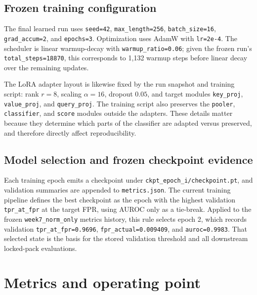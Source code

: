 \subsection{Frozen training configuration}

The final learned run uses \texttt{seed=42}, \texttt{max\_length=256}, \texttt{batch\_size=16}, \texttt{grad\_accum=2}, and \texttt{epochs=3}. Optimization uses AdamW with \texttt{lr=2e-4}. The scheduler is linear warmup-decay with \texttt{warmup\_ratio=0.06}; given the frozen run's \texttt{total\_steps=18870}, this corresponds to 1,132 warmup steps before linear decay over the remaining updates.

The LoRA adapter layout is likewise fixed by the run snapshot and training script: rank $r=8$, scaling $\alpha=16$, dropout $0.05$, and target modules \texttt{key\_proj}, \texttt{value\_proj}, and \texttt{query\_proj}. The training script also preserves the \texttt{pooler}, \texttt{classifier}, and \texttt{score} modules outside the adapters. These details matter because they determine which parts of the classifier are adapted versus preserved, and therefore directly affect reproducibility.

\subsection{Model selection and frozen checkpoint evidence}

Each training epoch emits a checkpoint under \texttt{ckpt\_epoch\_i/checkpoint.pt}, and validation summaries are appended to \texttt{metrics.json}. The current training pipeline defines the best checkpoint as the epoch with the highest validation \texttt{tpr\_at\_fpr} at the target FPR, using AUROC only as a tie-break. Applied to the frozen \texttt{week7\_norm\_only} metrics history, this rule selects epoch 2, which records validation \texttt{tpr\_at\_fpr=0.9696}, \texttt{fpr\_actual=0.009409}, and \texttt{auroc=0.9983}. That selected state is the basis for the stored validation threshold and all downstream locked-pack evaluations.

\section{Metrics and operating point}

